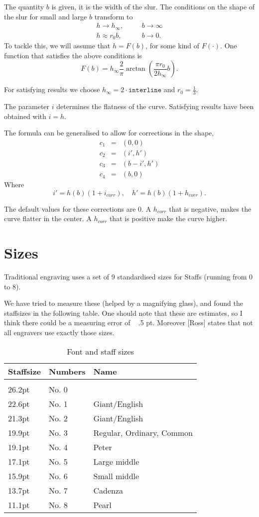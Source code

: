 \documentclass{article}
\begin{document}
The quantity $b$ is given, it is the width of the slur.  The
conditions on the shape of the slur for small and large $b$ transform
to
\begin{eqnarray*}
 h \to h_{\infty} , &&\quad b \to \infty\\
 h \approx r_{0} b, &&\quad b \to 0.
\end{eqnarray*}
To tackle  this, we  will  assume that $h   = F(b)$, for  some kind of
$F(\cdot)$.  One function that satisfies the above conditions is
$$
F(b) = h_{\infty} \frac{2}{\pi} \arctan \left( \frac{\pi r_0}{2
h_{\infty}} b \right).
$$

For satisfying results we choose $h_{\infty} = 2\cdot \texttt{interline}$
and $r_0 = \frac 13$.

The parameter $i$ determines the flatness of the curve.  Satisfying
results have been obtained with $i = h$.

The formula can be generalised to allow for corrections in the shape, 
\begin{eqnarray*}
c_1&=& (0,0)\\
c_2&=& (i', h')\\
c_3&=& (b-i', h')\\
c_4&=& (b, 0)
\end{eqnarray*}
Where
$$
i' = h(b) (1 + i_{corr}), \quad h' = h(b) (1 + h_{corr}).
$$

The default values for these corrections are $0$.  A $h_{corr}$ that is
negative, makes the curve flatter in the center.  A $h_{corr}$ that is
positive make the curve higher.


\section{Sizes}


Traditional engraving uses a set of 9 standardised sizes for Staffs
(running from 0 to 8).  

We have tried to measure these (helped by a magnifying glass), and
found the staffsizes in the following table.  One should note that
these are estimates, so I think there could be a measuring error of ~
.5 pt.  Moreover [Ross] states that not all engravers use exactly
those sizes.

\begin{table}
\begin{tabular}{lll}
Staffsize	&Numbers		&Name\\
\hline\\
26.2pt	&No. 0\\
22.6pt	&No. 1		&Giant/English\\
21.3pt	&No. 2		&Giant/English\\
19.9pt	&No. 3		&Regular, Ordinary, Common\\
19.1pt	&No. 4		&Peter\\
17.1pt	&No. 5		&Large middle\\
15.9pt	&No. 6		&Small middle\\
13.7pt	&No. 7		&Cadenza\\
11.1pt	&No. 8		&Pearl\\
\end{tabular}
\caption{Font and staff sizes}
\end{table}
\end{document}

